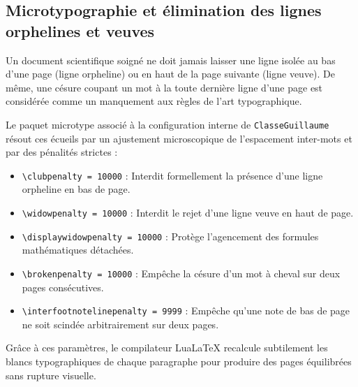 \subsection{Microtypographie et élimination des lignes orphelines et veuves}
\label{subsec:microtypographie}

Un document scientifique soigné ne doit jamais laisser une ligne isolée au bas d'une page (ligne orpheline) ou en haut de la page suivante (ligne veuve).
De même, une césure coupant un mot à la toute dernière ligne d'une page est considérée comme un manquement aux règles de l'art typographique.

Le paquet \textsf{microtype} associé à la configuration interne de \texttt{ClasseGuillaume} résout ces écueils par un ajustement microscopique de l'espacement inter-mots et par des pénalités strictes :

\begin{itemize}
  \item \texttt{\textbackslash clubpenalty = 10000} : Interdit formellement la présence d'une ligne orpheline en bas de page.
  \item \texttt{\textbackslash widowpenalty = 10000} : Interdit le rejet d'une ligne veuve en haut de page.
  \item \texttt{\textbackslash displaywidowpenalty = 10000} : Protège l'agencement des formules mathématiques détachées.
  \item \texttt{\textbackslash brokenpenalty = 10000} : Empêche la césure d'un mot à cheval sur deux pages consécutives.
  \item \texttt{\textbackslash interfootnotelinepenalty = 9999} : Empêche qu'une note de bas de page ne soit scindée arbitrairement sur deux pages.
\end{itemize}

Grâce à ces paramètres, le compilateur Lua\LaTeX{} recalcule subtilement les blancs typographiques de chaque paragraphe pour produire des pages équilibrées sans rupture visuelle.

